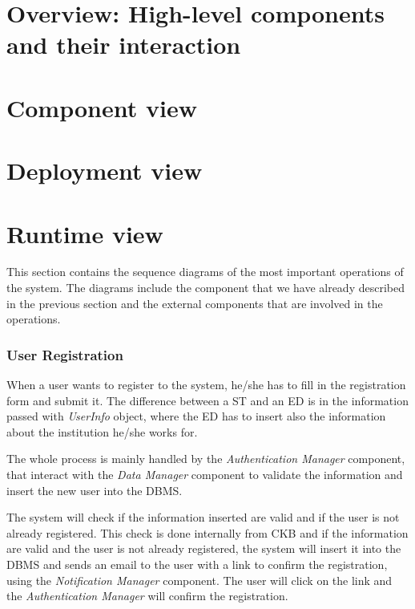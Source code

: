 \section{Overview: High-level components and their interaction}
\label{s:overview}%

\section{Component view}
\label{s:component-view}%

\section{Deployment view}
\label{s:deployment-view}%

\newpage

\section{Runtime view}
\label{s:runtime-view}%
This section contains the sequence diagrams of the most important operations of the system. The diagrams include the component that we have already described in the previous section and the external components that are involved in the operations.

\subsubsection*{User Registration}
\label{ss:registration_diagram}%
When a user wants to register to the system, he/she has to fill in the registration form and submit it. The difference between a ST and an ED is in the information passed with \textit{UserInfo} object, where the ED has to insert also the information about the institution he/she works for.

The whole process is mainly handled by the \textit{Authentication Manager} component, that interact with the \textit{Data Manager} component to validate the information and insert the new user into the DBMS.

The system will check if the information inserted are valid and if the user is not already registered. This check is done internally from CKB and if the information are valid and the user is not already registered, the system will insert it into the DBMS and sends an email to the user with a link to confirm the registration, using the \textit{Notification Manager} component. The user will click on the link and the \textit{Authentication Manager} will confirm the registration.

